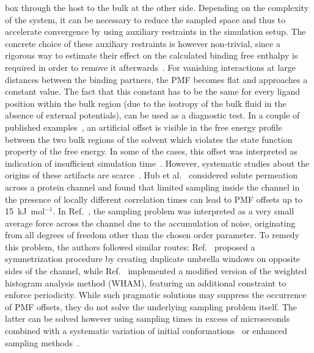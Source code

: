 \documentclass[9pt,lessons,pubversion]{livecoms}
\begin{document}
box through the host to the bulk at the other side.
Depending on the complexity of the system, it can be necessary to reduce the sampled space and thus to accelerate convergence by using auxiliary restraints in the simulation setup.
The concrete choice of these auxiliary restraints is however non-trivial, since a rigorous way to estimate their effect on the calculated binding free enthalpy is required in order to remove it afterwards~\cite{woo2005calculation, boresch2003absolute}.
For vanishing interactions at large distances between the binding partners, the PMF becomes flat and approaches a constant value.
The fact that this constant has to be the same for every ligand position within the bulk region (due to the isotropy of the bulk fluid in the absence of external potentials), can be used as a diagnostic test.
In a couple of published examples~\cite{filippini2012energetic, filippini2012association, allen2006ion, allen2006molecular, bacstuug2008potential, hub2010g_wham, kruger2009potential}, an artificial offset is visible in the free energy profile between the two bulk regions of the solvent which violates the state function property of the free energy.
In some of the cases, this offset was interpreted as indication of insufficient simulation time~\cite{bacstuug2008potential}.
However, systematic studies about the origins of these artifacts are scarce~\cite{velez2013overcoming}. 
Hub et al.~\cite{hub2010g_wham} considered solute permeation across a protein channel and found that limited sampling inside the channel in the presence of locally different correlation times can lead to PMF offsets up to 15~kJ~mol$^{-1}$.
In Ref.~, the sampling problem was interpreted as a very small average force across the channel due to the accumulation of noise, originating from all degrees of freedom other than the chosen order parameter.
To remedy this problem, the authors followed similar routes: 
Ref.~ proposed a symmetrization procedure by creating duplicate umbrella windows on opposite sides of the channel, while Ref.~ implemented a modified version of the weighted histogram analysis method (WHAM), featuring an additional constraint to enforce periodicity.
While such pragmatic solutions may suppress the occurrence of PMF offsets, they do not solve the underlying sampling problem itself.
The latter can be solved however using sampling times in excess of microseconds combined with a systematic variation of initial conformations~\cite{neale2014indolicidin} or enhanced sampling methods~\cite{sun2018molecular}.
\end{document}
